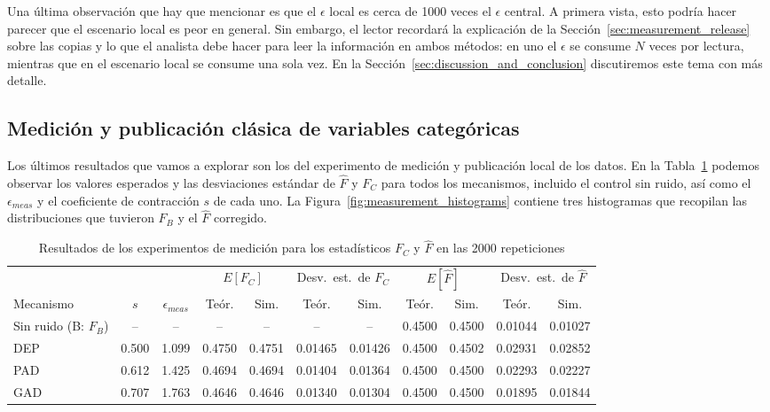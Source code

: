 \documentclass{ieeeaccess}
\begin{document}
Una última observación que hay que mencionar es que el $\epsilon$ local es cerca de 1000 veces el $\epsilon$ central. A primera vista, esto podría hacer parecer que el escenario local es peor en general. Sin embargo, el lector recordará la explicación de la Sección~\ref{sec:measurement_release} sobre las copias y lo que el analista debe hacer para leer la información en ambos métodos: en uno el $\epsilon$ se consume $N$ veces por lectura, mientras que en el escenario local se consume una sola vez. En la Sección~\ref{sec:discussion_and_conclusion} discutiremos este tema con más detalle.

\subsection{Medición y publicación clásica de variables categóricas}
\label{subsec:measurement_results}

Los últimos resultados que vamos a explorar son los del experimento de medición y publicación local de los datos. En la Tabla~\ref{tab:measurement_results} podemos observar los valores esperados y las desviaciones estándar de $\hat{F}$ y $F_C$ para todos los mecanismos, incluido el control sin ruido, así como el $\epsilon_{meas}$ y el coeficiente de contracción $s$ de cada uno. La Figura~\ref{fig:measurement_histograms} contiene tres histogramas que recopilan las distribuciones que tuvieron $F_B$ y el $\hat{F}$ corregido.

\begin{table}[!t]
  \caption{Resultados de los experimentos de medición para los estadísticos $F_C$ y $\hat{F}$ en las 2000 repeticiones}
  \label{tab:measurement_results}
  \centering
  \begin{tabular}{lcccccccccc}
    \toprule
     & & & \multicolumn{2}{c}{$E[F_C]$} & \multicolumn{2}{c}{Desv.\ est.\ de $F_C$} & \multicolumn{2}{c}{$E[\hat{F}]$} & \multicolumn{2}{c}{Desv.\ est.\ de $\hat{F}$} \\
    \cmidrule(lr){4-5} \cmidrule(lr){6-7} \cmidrule(lr){8-9} \cmidrule(l){10-11}
    Mecanismo & $s$ & $\epsilon_{meas}$ & Teór. & Sim. & Teór. & Sim. & Teór. & Sim. & Teór. & Sim. \\
    \midrule
    Sin ruido (B: $F_B$) & --    & --    & --     & --     & --      & --      & 0.4500 & 0.4500 & 0.01044 & 0.01027 \\
    DEP                 & 0.500 & 1.099 & 0.4750 & 0.4751 & 0.01465 & 0.01426 & 0.4500 & 0.4502 & 0.02931 & 0.02852 \\
    PAD                 & 0.612 & 1.425 & 0.4694 & 0.4694 & 0.01404 & 0.01364 & 0.4500 & 0.4500 & 0.02293 & 0.02227 \\
    GAD                 & 0.707 & 1.763 & 0.4646 & 0.4646 & 0.01340 & 0.01304 & 0.4500 & 0.4500 & 0.01895 & 0.01844 \\
    \bottomrule
  \end{tabular}
\end{table}
\end{document}
